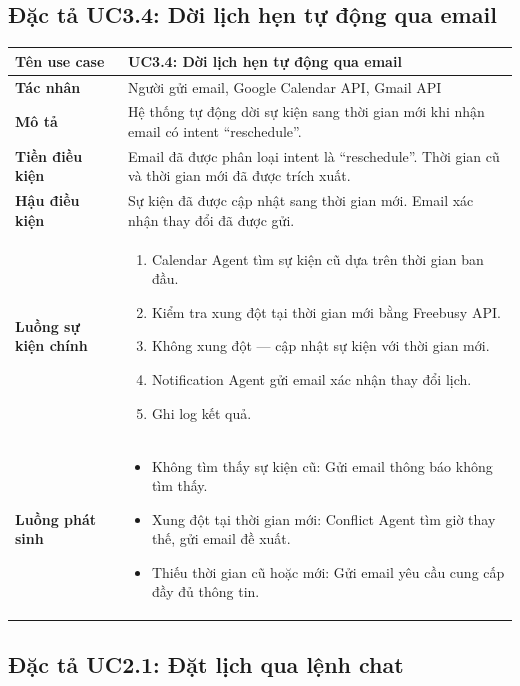 \documentclass[../DoAn.tex]{subfiles}
\begin{document}
\subsection{Đặc tả UC3.4: Dời lịch hẹn tự động qua email}

\begin{table}[H]
\centering
\small
\begin{tabular}{|p{3.5cm}|p{10cm}|}
\hline
\textbf{Tên use case} & UC3.4: Dời lịch hẹn tự động qua email \\
\hline
\textbf{Tác nhân} & Người gửi email, Google Calendar API, Gmail API \\
\hline
\textbf{Mô tả} & Hệ thống tự động dời sự kiện sang thời gian mới khi nhận email có intent ``reschedule''. \\
\hline
\textbf{Tiền điều kiện} & Email đã được phân loại intent là ``reschedule''. Thời gian cũ và thời gian mới đã được trích xuất. \\
\hline
\textbf{Hậu điều kiện} & Sự kiện đã được cập nhật sang thời gian mới. Email xác nhận thay đổi đã được gửi. \\
\hline
\textbf{Luồng sự kiện chính} &
\begin{enumerate}
    \item Calendar Agent tìm sự kiện cũ dựa trên thời gian ban đầu.
    \item Kiểm tra xung đột tại thời gian mới bằng Freebusy API.
    \item Không xung đột — cập nhật sự kiện với thời gian mới.
    \item Notification Agent gửi email xác nhận thay đổi lịch.
    \item Ghi log kết quả.
\end{enumerate} \\
\hline
\textbf{Luồng phát sinh} &
\begin{itemize}
    \item[1a.] Không tìm thấy sự kiện cũ: Gửi email thông báo không tìm thấy.
    \item[2a.] Xung đột tại thời gian mới: Conflict Agent tìm giờ thay thế, gửi email đề xuất.
    \item[*] Thiếu thời gian cũ hoặc mới: Gửi email yêu cầu cung cấp đầy đủ thông tin.
\end{itemize} \\
\hline
\end{tabular}
\end{table}

\subsection{Đặc tả UC2.1: Đặt lịch qua lệnh chat}
\end{document}
